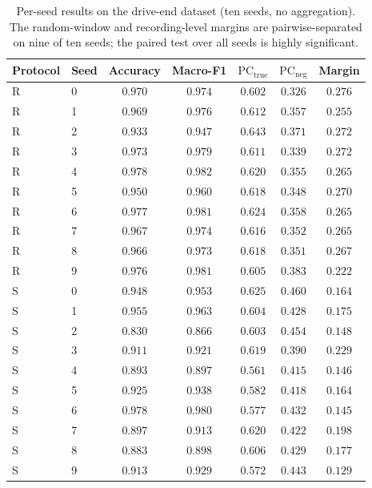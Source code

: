 \documentclass[11pt]{article}
\begin{document}
\begin{table}[H]
\centering
\caption{Per-seed results on the drive-end dataset (ten seeds, no aggregation). The
random-window and recording-level margins are pairwise-separated on nine of ten seeds; the
paired test over all seeds is highly significant.}
\label{tab:perseed}
\begin{tabular}{llccccc}
\toprule
Protocol & Seed & Accuracy & Macro-F1 & $\mathrm{PC_{true}}$ & $\mathrm{PC_{neg}}$ & Margin \\
\midrule
R & 0 & $0.970$ & $0.974$ & $0.602$ & $0.326$ & $0.276$ \\
R & 1 & $0.969$ & $0.976$ & $0.612$ & $0.357$ & $0.255$ \\
R & 2 & $0.933$ & $0.947$ & $0.643$ & $0.371$ & $0.272$ \\
R & 3 & $0.973$ & $0.979$ & $0.611$ & $0.339$ & $0.272$ \\
R & 4 & $0.978$ & $0.982$ & $0.620$ & $0.355$ & $0.265$ \\
R & 5 & $0.950$ & $0.960$ & $0.618$ & $0.348$ & $0.270$ \\
R & 6 & $0.977$ & $0.981$ & $0.624$ & $0.358$ & $0.265$ \\
R & 7 & $0.967$ & $0.974$ & $0.616$ & $0.352$ & $0.265$ \\
R & 8 & $0.966$ & $0.973$ & $0.618$ & $0.351$ & $0.267$ \\
R & 9 & $0.976$ & $0.981$ & $0.605$ & $0.383$ & $0.222$ \\
\midrule
S & 0 & $0.948$ & $0.953$ & $0.625$ & $0.460$ & $0.164$ \\
S & 1 & $0.955$ & $0.963$ & $0.604$ & $0.428$ & $0.175$ \\
S & 2 & $0.830$ & $0.866$ & $0.603$ & $0.454$ & $0.148$ \\
S & 3 & $0.911$ & $0.921$ & $0.619$ & $0.390$ & $0.229$ \\
S & 4 & $0.893$ & $0.897$ & $0.561$ & $0.415$ & $0.146$ \\
S & 5 & $0.925$ & $0.938$ & $0.582$ & $0.418$ & $0.164$ \\
S & 6 & $0.978$ & $0.980$ & $0.577$ & $0.432$ & $0.145$ \\
S & 7 & $0.897$ & $0.913$ & $0.620$ & $0.422$ & $0.198$ \\
S & 8 & $0.883$ & $0.898$ & $0.606$ & $0.429$ & $0.177$ \\
S & 9 & $0.913$ & $0.929$ & $0.572$ & $0.443$ & $0.129$ \\
\bottomrule
\end{tabular}
\end{table}
\end{document}
